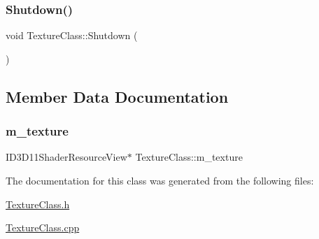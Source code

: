\subsubsection{\texorpdfstring{Shutdown()}{Shutdown()}}
{\footnotesize\ttfamily void Texture\+Class\+::\+Shutdown (\begin{DoxyParamCaption}{ }\end{DoxyParamCaption})}



\subsection{Member Data Documentation}
\mbox{\label{class_texture_class_a9f4a1ba96054c4e3201e272cf7d1ae14}} 
\subsubsection{\texorpdfstring{m\+\_\+texture}{m\_texture}}
{\footnotesize\ttfamily I\+D3\+D11\+Shader\+Resource\+View$\ast$ Texture\+Class\+::m\+\_\+texture\hspace{0.3cm}{\ttfamily [private]}}



The documentation for this class was generated from the following files\+:\begin{DoxyCompactItemize}
\item 
\hyperlink{_texture_class_8h}{Texture\+Class.\+h}\item 
\hyperlink{_texture_class_8cpp}{Texture\+Class.\+cpp}\end{DoxyCompactItemize}
